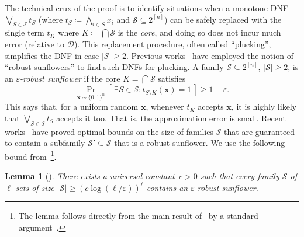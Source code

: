 \documentclass[11pt]{article}
\theoremstyle{plain}
\newtheorem{lemma}{Lemma}
\theoremstyle{definition}
\theoremstyle{remark}
\newcommand{\eps}{\varepsilon}
\def\cald{{\mathcal D}}
\def\cals{{\mathcal S}}
\begin{document}
The technical crux of the proof is to identify situations when a monotone DNF $\bigvee_{S\in\cals} t_S$ (where $t_S\coloneqq \bigwedge_{i\in S}x_i$ and $\cals\subseteq 2^{[n]}$) can be safely replaced 
with the single term $t_K$ where $K\coloneqq\bigcap\cals$ is the \emph{core}, and doing so does not incur much error (relative to $\cald$). This replacement procedure, often called ``plucking'', simplifies the DNF in case $|\cals|\geq 2$. 
Previous works~\cite{Rossman2014,Cavalar2020,Blasiok2025}
have employed the notion of ``robust sunflowers'' to find such DNFs for plucking. A family $\cals\subseteq 2^{[n]}$, $|\cals|\geq 2$, is an
\emph{$\varepsilon$-robust sunflower} if 
the core $K = \bigcap \cals$
satisfies
\begin{equation}
    \label{eq:robustness-cond}
    \Pr_{\bm x \sim \{0,1\}^n}[\,\exists S \in \cals \colon t_{S
    \setminus K}(\bm x) =1\,] \geq 1-\eps.
\end{equation}
This says that, for a uniform random $\bm x$, whenever $t_K$ accepts $\bm x$, it is highly likely that $\bigvee_{S\in\cals}t_S$ accepts it too. That is, the approximation error is small. Recent works~\cite{Alweiss2021,Rao2020,bcw21} have proved optimal bounds on the size of families $\cals$ that are guaranteed to contain a subfamily $\cals'\subseteq\cals$ that is a robust sunflower.
We use the following bound from~\cite[Theorem 3]{bcw21}\footnote{
    The lemma follows directly from the main result of~\cite{bcw21} 
    by a standard argument~\cite[Appendix A]{Cavalar2020}.
}.
\begin{lemma}[]
\label{lem:robust-sunflowers}
    There exists a universal constant~$c>0$
    such that every
    family $\cals$ of $\ell$-sets of size $|\cals|\geq (c\log (\ell/\varepsilon))^\ell$ contains an $\eps$-robust sunflower.
\end{lemma}
\end{document}
